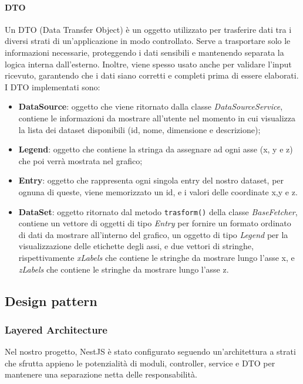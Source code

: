 \paragraph{DTO}
Un DTO (Data Transfer Object) è un oggetto utilizzato per trasferire dati tra i diversi strati di un'applicazione in modo controllato. Serve a trasportare solo le informazioni necessarie, proteggendo i dati sensibili e mantenendo separata la logica interna dall’esterno. Inoltre, viene spesso usato anche per validare l'input ricevuto, garantendo che i dati siano corretti e completi prima di essere elaborati.
I DTO implementati sono:
\begin{itemize}
    \item \textbf{DataSource}: oggetto che viene ritornato dalla classe \textit{DataSourceService}, contiene le informazioni da mostrare all'utente nel momento in cui visualizza la lista dei dataset disponibili (id, nome, dimensione e descrizione);
    \item \textbf{Legend}: oggetto che contiene la stringa da assegnare ad ogni asse (x, y e z) che poi verrà mostrata nel grafico; 
    \item \textbf{Entry}: oggetto che rappresenta ogni singola entry del nostro dataset, per ognuna di queste, viene memorizzato un id, e i valori delle coordinate x,y e z.
    \item \textbf{DataSet}: oggetto ritornato dal metodo \texttt{trasform()} della classe \textit{BaseFetcher}, contiene un vettore di oggetti di tipo \textit{Entry} per fornire un formato ordinato di dati da mostrare all'interno del grafico, un oggetto di tipo \textit{Legend} per la visualizzazione delle etichette degli assi, e due vettori di stringhe, rispettivamente \textit{xLabels} che contiene le stringhe da mostrare lungo l'asse x, e \textit{zLabels} che contiene le stringhe da mostrare lungo l'asse z.
\end{itemize}

\subsection{Design pattern}
\subsubsection{Layered Architecture}
Nel nostro progetto, NestJS è stato configurato seguendo un'architettura a strati che sfrutta appieno le potenzialità di moduli, controller, service e DTO per mantenere una separazione netta delle responsabilità.

